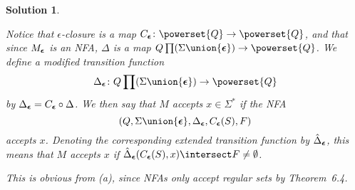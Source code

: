 \documentclass[article, a4paper, 11pt, oneside]{memoir}
\numberwithin{equation}{chapter}
\theoremstyle{nonumberplain}
\newtheorem{solution}{Solution}
\theoremstyle{myexample}
\theoremstyle{myexamplebreak}
\begin{document}
\begin{solution}
\begin{solutionsec}
    \item Notice that $\epsilon$-closure is a map $C_{\Bepsilon} \colon \powerset{Q} \to \powerset{Q}$, and that since $M_{\bm{\epsilon}}$ is an NFA, $\Delta$ is a map $Q \prod (\Sigma \union \{\Bepsilon\}) \to \powerset{Q}$. We define a modified transition function
    \begin{equation*}
        \Delta_{\Bepsilon} \colon Q \prod (\Sigma \union \{\Bepsilon\}) \to \powerset{Q}
    \end{equation*}
    by $\Delta_{\bm{\epsilon}} = C_{\bm{\epsilon}} \circ \Delta$. We then say that $M$ \emph{accepts} $x \in \Sigma^*$ if the NFA
    \begin{equation*}
        (Q, \Sigma \union \{\Bepsilon\}, \Delta_{\Bepsilon}, C_{\Bepsilon}(S), F)
    \end{equation*}
    accepts $x$. Denoting the corresponding extended transition function by $\hat\Delta_{\bm{\epsilon}}$, this means that $M$ accepts $x$ if $\hat\Delta_{\Bepsilon}(C_{\Bepsilon}(S),x) \intersect F \neq \emptyset$.

    \item This is obvious from (a), since NFAs only accept regular sets by Theorem~6.4.


\end{solutionsec}
\end{solution}
\end{document}

